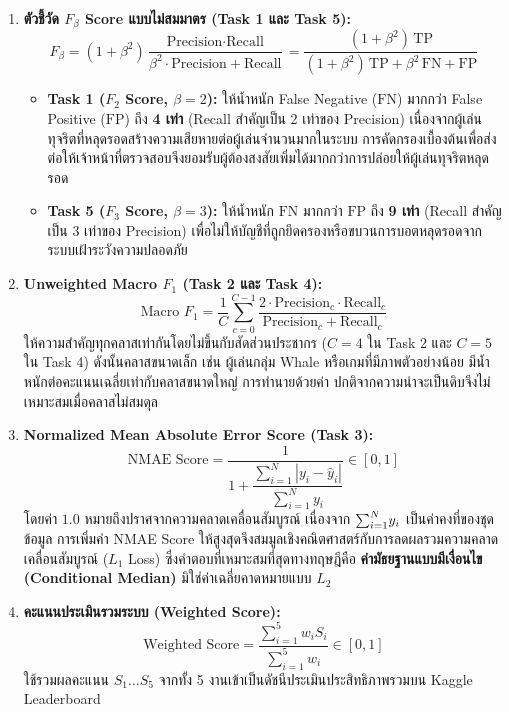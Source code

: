 \documentclass[11pt,a4paper]{article}
\DeclareRobustCommand{\code}[1]{\leavevmode{\ttfamily\color{KeyGreen!85!black}\let\codeunderscore\_\def\_{\codeunderscore\allowbreak}\hyphenpenalty=50\exhyphenpenalty=50\relax#1}}
\begin{document}
\begin{enumerate}
    \item \textbf{ตัวชี้วัด $F_\beta$ Score แบบไม่สมมาตร (Task 1 และ Task 5):}
    \[
    F_\beta = (1 + \beta^2)\frac{\text{Precision} \cdot \text{Recall}}{\beta^2 \cdot \text{Precision} + \text{Recall}} = \frac{(1 + \beta^2)\,\text{TP}}{(1 + \beta^2)\,\text{TP} + \beta^2\,\text{FN} + \text{FP}}
    \]
    \begin{itemize}
        \item \textbf{Task 1 ($F_2$ Score, $\beta=2$):} ให้น้ำหนัก False Negative ($\text{FN}$) มากกว่า False Positive ($\text{FP}$) ถึง \textbf{4 เท่า} (Recall สำคัญเป็น 2 เท่าของ Precision) เนื่องจากผู้เล่นทุจริตที่หลุดรอดสร้างความเสียหายต่อผู้เล่นจำนวนมากในระบบ การคัดกรองเบื้องต้นเพื่อส่งต่อให้เจ้าหน้าที่ตรวจสอบจึงยอมรับผู้ต้องสงสัยเพิ่มได้มากกว่าการปล่อยให้ผู้เล่นทุจริตหลุดรอด
        \item \textbf{Task 5 ($F_3$ Score, $\beta=3$):} ให้น้ำหนัก $\text{FN}$ มากกว่า $\text{FP}$ ถึง \textbf{9 เท่า} (Recall สำคัญเป็น 3 เท่าของ Precision) เพื่อไม่ให้บัญชีที่ถูกยึดครองหรือขบวนการบอตหลุดรอดจากระบบเฝ้าระวังความปลอดภัย
    \end{itemize}

    \item \textbf{Unweighted Macro $F_1$ (Task 2 และ Task 4):}
    \[
    \text{Macro } F_1 = \frac{1}{C}\sum_{c=0}^{C-1} \frac{2 \cdot \text{Precision}_c \cdot \text{Recall}_c}{\text{Precision}_c + \text{Recall}_c}
    \]
    ให้ความสำคัญทุกคลาสเท่ากันโดยไม่ขึ้นกับสัดส่วนประชากร ($C=4$ ใน Task 2 และ $C=5$ ใน Task 4) ดังนั้นคลาสขนาดเล็ก เช่น ผู้เล่นกลุ่ม Whale หรือเกมที่มีภาพตัวอย่างน้อย มีน้ำหนักต่อคะแนนเฉลี่ยเท่ากับคลาสขนาดใหญ่ การทำนายด้วยค่า \code{argmax} ปกติจากความน่าจะเป็นดิบจึงไม่เหมาะสมเมื่อคลาสไม่สมดุล

    \item \textbf{Normalized Mean Absolute Error Score (Task 3):}
    \[
    \text{NMAE Score} = \frac{1}{1 + \dfrac{\sum_{i=1}^{N} |y_i - \hat{y}_i|}{\sum_{i=1}^{N} y_i}} \in [0, 1]
    \]
    โดยค่า $1.0$ หมายถึงปราศจากความคลาดเคลื่อนสัมบูรณ์ เนื่องจาก $\smash{\sum_{i=1}^N} y_i$ เป็นค่าคงที่ของชุดข้อมูล การเพิ่มค่า NMAE Score ให้สูงสุดจึงสมมูลเชิงคณิตศาสตร์กับการลดผลรวมความคลาดเคลื่อนสัมบูรณ์ ($L_1$ Loss) ซึ่งคำตอบที่เหมาะสมที่สุดทางทฤษฎีคือ \textbf{ค่ามัธยฐานแบบมีเงื่อนไข (Conditional Median)} มิใช่ค่าเฉลี่ยคาดหมายแบบ $L_2$

    \item \textbf{คะแนนประเมินรวมระบบ (Weighted Score):}
    \[
    \text{Weighted Score} = \frac{\sum_{i=1}^{5} w_i S_i}{\sum_{i=1}^{5} w_i} \in [0, 1]
    \]
    ใช้รวมผลคะแนน $S_1 \dots S_5$ จากทั้ง 5 งานเข้าเป็นดัชนีประเมินประสิทธิภาพรวมบน Kaggle Leaderboard
\end{enumerate}
\end{document}
